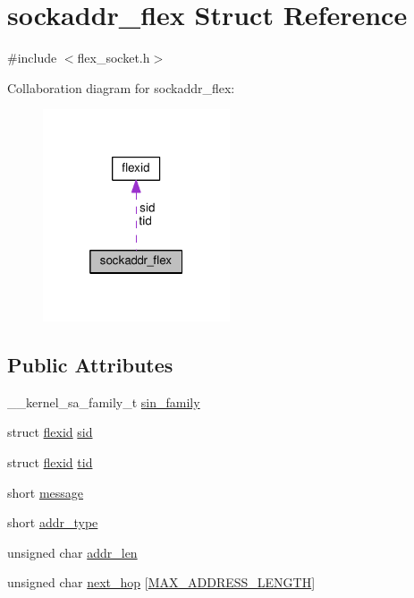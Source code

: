 \hypertarget{structsockaddr__flex}{}\section{sockaddr\+\_\+flex Struct Reference}
\label{structsockaddr__flex}


{\ttfamily \#include $<$flex\+\_\+socket.\+h$>$}



Collaboration diagram for sockaddr\+\_\+flex\+:\nopagebreak
\begin{figure}[H]
\begin{center}
\leavevmode
\includegraphics[width=157pt]{structsockaddr__flex__coll__graph}
\end{center}
\end{figure}
\subsection*{Public Attributes}
\begin{DoxyCompactItemize}
\item 
\+\_\+\+\_\+kernel\+\_\+sa\+\_\+family\+\_\+t \hyperlink{structsockaddr__flex_a0bebb0734429c3e6a548fc61de27c9c0}{sin\+\_\+family}
\item 
struct \hyperlink{structflexid}{flexid} \hyperlink{structsockaddr__flex_ae2d332f61042d379e3521f7e42603037}{sid}
\item 
struct \hyperlink{structflexid}{flexid} \hyperlink{structsockaddr__flex_a841742293b927751d2c0f8c48d7a5828}{tid}
\item 
short \hyperlink{structsockaddr__flex_ac1581ee2d027808218f3173c372924a1}{message}
\item 
short \hyperlink{structsockaddr__flex_a8945354761455603e8f09077e454defe}{addr\+\_\+type}
\item 
unsigned char \hyperlink{structsockaddr__flex_a44a4c4cabcecc77838283ed0a2fe22bb}{addr\+\_\+len}
\item 
unsigned char \hyperlink{structsockaddr__flex_a6869850bbb4ae164d955372332fffee3}{next\+\_\+hop} \mbox{[}\hyperlink{flex__addr_8h_a13b71bf0266170fc990217b80b27f40d}{M\+A\+X\+\_\+\+A\+D\+D\+R\+E\+S\+S\+\_\+\+L\+E\+N\+G\+TH}\mbox{]}
\end{DoxyCompactItemize}



